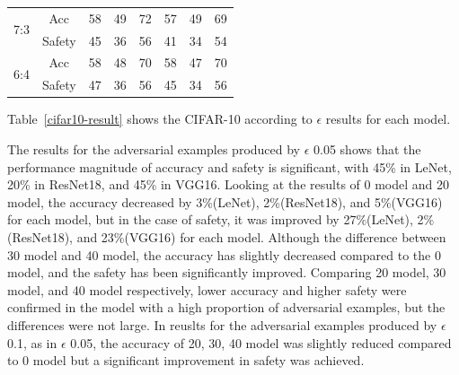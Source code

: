 \documentclass[journal,article,submit,moreauthors,pdftex]{Definitions/mdpi}
\begin{document}
\begin{specialtable}[H]
{\begin{tabular}{|c|c|c|c|c|c|c|c|}
    \multirow{2}{*}{7:3}         & Acc                       & 58                  & 49                    & 72                 & 57                 & 49                    & 69                 \\ \cline{2-8} 
                                 & Safety                    & 45                  & 36                    & 56                 & 41                 & 34                    & 54                 \\ \hline
    \multirow{2}{*}{6:4}         & Acc                       & 58                  & 48                    & 70                 & 58                 & 47                    & 70                 \\ \cline{2-8} 
                                 & Safety                    & 47                  & 36                    & 56                 & 45                 & 34                    & 56                 \\ \hline
    \end{tabular}
    }
\end{specialtable}

Table~\ref{cifar10-result} shows the CIFAR-10 according to \begin{math}\epsilon\end{math} results for each model.

The results for the adversarial examples produced by \begin{math}\epsilon\end{math} 0.05 shows that the performance magnitude of accuracy and safety is significant, with 45\%  in LeNet, 20\% in ResNet18, and 45\% in VGG16.
Looking at the results of 0 model and 20 model, the accuracy decreased by 3\%(LeNet), 2\%(ResNet18), and 5\%(VGG16) for each model, but in the case of safety, it was improved by 27\%(LeNet), 2\%(ResNet18), and 23\%(VGG16) for each model.
Although the difference between 30 model and 40 model, the accuracy has slightly decreased compared to the 0 model, and the safety has been significantly improved.
Comparing 20 model, 30 model, and 40 model respectively, lower accuracy and higher safety were confirmed in the model with a high proportion of adversarial examples, but the differences were not large.
In reuslts for the adversarial examples produced by \begin{math}\epsilon\end{math} 0.1, as in \begin{math}\epsilon\end{math} 0.05, the accuracy of 20, 30, 40 model was slightly reduced compared to 0 model but a significant improvement in safety was achieved.
\end{document}
